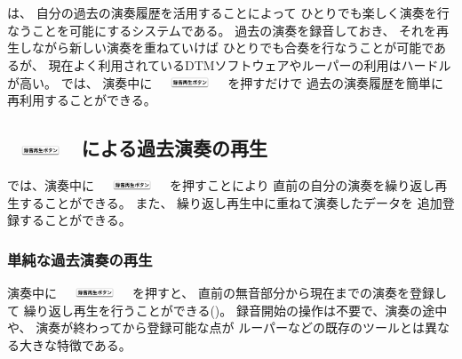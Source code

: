 %
%
\section{\system}
\label{repiano}

{\system}は、
自分の過去の演奏履歴を活用することによって
ひとりでも楽しく演奏を行なうことを可能にするシステムである。
%
過去の演奏を録音しておき、
それを再生しながら新しい演奏を重ねていけば
ひとりでも合奏を行なうことが可能であるが、
現在よく利用されているDTMソフトウェアやルーパーの利用はハードルが高い。
{\system}では、
演奏中に
\includegraphics[height=3mm,width=20mm,bb=3 23 360 80]{images/recbutton.png}
を押すだけで
過去の演奏履歴を簡単に再利用することができる。

\subsection{\protect\includegraphics[height=3mm,width=20mm,bb=3 23 360 80]{images/recbutton.png} による過去演奏の再生}
\label{recplaybutton}

{\system}では、演奏中に
\includegraphics[height=3mm,width=20mm,bb=3 23 360 80]{images/recbutton.png}
を押すことにより
直前の自分の演奏を繰り返し再生することができる。
また、
繰り返し再生中に重ねて演奏したデータを
追加登録することができる。

\subsubsection{単純な過去演奏の再生}

演奏中に
\includegraphics[height=3mm,width=20mm,bb=3 23 360 80]{images/recbutton.png}
を押すと、
直前の無音部分から現在までの演奏を登録して
繰り返し再生を行うことができる()。
%
録音開始の操作は不要で、演奏の途中や、
演奏が終わってから登録可能な点が
ルーパーなどの既存のツールとは異なる大きな特徴である。

